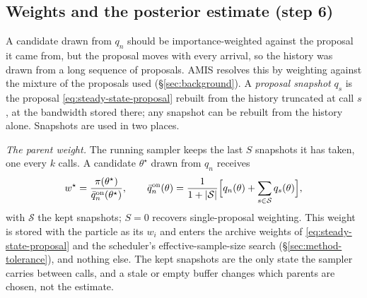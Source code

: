 \documentclass[10pt]{article}
\theoremstyle{plain}
\theoremstyle{definition}
\begin{document}
\subsection{Weights and the posterior estimate (step 6)}\label{sec:method-weights}\label{sec:method-amis}\label{sec:method-estimate}
A candidate drawn from $q_n$ should be importance-weighted against the proposal it came from, but the proposal moves with every arrival, so the history was drawn from a long sequence of proposals. AMIS resolves this by weighting against the mixture of the proposals used (\S\ref{sec:background}). A \emph{proposal snapshot} $q_s$ is the proposal \eqref{eq:steady-state-proposal} rebuilt from the history truncated at call $s$, at the bandwidth stored there; any snapshot can be rebuilt from the history alone. Snapshots are used in two places.

\emph{The parent weight.} The running sampler keeps the last $S$ snapshots it has taken, one every $k$ calls. A candidate $\theta^\star$ drawn from $q_n$ receives
\begin{equation}
w^\star = \frac{\pi(\theta^\star)}{\bar q^{\mathrm{on}}_n(\theta^\star)},
\qquad
\bar q^{\mathrm{on}}_n(\theta) = \frac{1}{1+|\mathcal{S}|}\Bigl[q_n(\theta) + \sum_{s\in\mathcal{S}} q_s(\theta)\Bigr],
\label{eq:amis-weight}
\end{equation}
with $\mathcal{S}$ the kept snapshots; $S=0$ recovers single-proposal weighting. This weight is stored with the particle as its $w_i$ and enters the archive weights of \eqref{eq:steady-state-proposal} and the scheduler's effective-sample-size search (\S\ref{sec:method-tolerance}), and nothing else. The kept snapshots are the only state the sampler carries between calls, and a stale or empty buffer changes which parents are chosen, not the estimate.
\end{document}
